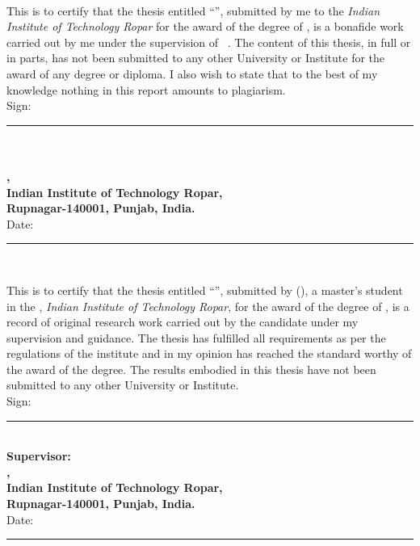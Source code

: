 \documentclass[11pt, a4paper, twoside]{Thesis}
\begin{document}
\clearpage\pagestyle{empty}
\begin{titlepage}
\begin{center}\textsc{\textbf{\fontsize{28}{30}\selectfont{Declaration}}}\\[2.0cm]\end{center}
This is to certify that the thesis entitled ``\textbf{\thesisTitle}'', submitted by me to the \textit{Indian Institute of Technology Ropar} for the award of the degree of \degreeName, is a bonafide work carried out by me under the supervision of \supervisorTitle\ \supervisorName. The content of this thesis, in full or in parts, has not been submitted to any other University or Institute for the award of any degree or diploma. I also wish to state that to the best of my knowledge nothing in this report amounts to plagiarism.
\vspace{3cm}\\
Sign:\\ \rule[1em]{25em}{0.5pt}\\[0.1cm]
\textbf{\authorName}\\
\textbf{\deptName,}\\
\textbf{Indian Institute of Technology Ropar,}\\
\textbf{Rupnagar-140001, Punjab, India.}\\[2cm]
\hfill{}Date:\\ \rule[1em]{25em}{0.5pt}
\end{titlepage}

\clearpage\pagestyle{empty}
\begin{titlepage}
\begin{center}\textsc{\textbf{\fontsize{28}{30}\selectfont{Certificate}}}\\[2.0cm]\end{center}
This is to certify that the thesis entitled ``\textbf{\thesisTitle}'', submitted by \textbf{\authorName} (\enrollmentNumber), a master's student in the \textit{\deptName}, \textit{Indian Institute of Technology Ropar}, for the award of the degree of \degreeName, is a record of original research work carried out by the candidate under my supervision and guidance. The thesis has fulfilled all requirements as per the regulations of the institute and in my opinion has reached the standard worthy of the award of the degree. The results embodied in this thesis have not been submitted to any other University or Institute.
\vspace{3cm}\\
Sign:\\ \rule[1em]{25em}{0.5pt}\\[0.1cm]
\textbf{Supervisor: \supervisorTitle\ \supervisorName}\\
\textbf{\deptName,}\\
\textbf{Indian Institute of Technology Ropar,}\\
\textbf{Rupnagar-140001, Punjab, India.}\\[2cm]
\hfill{}Date:\\ \rule[1em]{25em}{0.5pt}
\end{titlepage}
\end{document}
